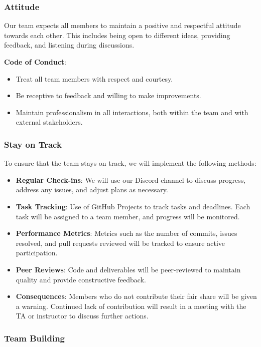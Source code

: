 \documentclass{article}
\begin{document}
\subsubsection*{Attitude}

Our team expects all members to maintain a positive and respectful attitude
towards each other. This includes being open to different ideas, providing
feedback, and  
listening during discussions.

\textbf{Code of Conduct}:
\begin{itemize}
    \item Treat all team members with respect and courtesy.
    \item Be receptive to feedback and willing to make improvements.
    \item Maintain professionalism in all interactions, both within the team and
    with external stakeholders.
\end{itemize}

\subsubsection*{Stay on Track}

To ensure that the team stays on track, we will implement the following methods:

\begin{itemize}
    \item \textbf{Regular Check-ins}: We will use our Discord channel to discuss
    progress, address any issues, and adjust plans as necessary.
    \item \textbf{Task Tracking}: Use of GitHub Projects to track tasks and
    deadlines. Each task will be assigned to a team member, and progress will be
    monitored.
    \item \textbf{Performance Metrics}: Metrics such as the number of commits,
    issues resolved, and pull requests reviewed will be tracked to ensure active
    participation.
    \item \textbf{Peer Reviews}: Code and deliverables will be peer-reviewed to
    maintain quality and provide constructive feedback.
    \item \textbf{Consequences}: Members who do not contribute their fair share
    will be given a warning. Continued lack of contribution will result in a
    meeting with the TA or instructor to discuss further actions.
\end{itemize}

\subsubsection*{Team Building}
\end{document}
